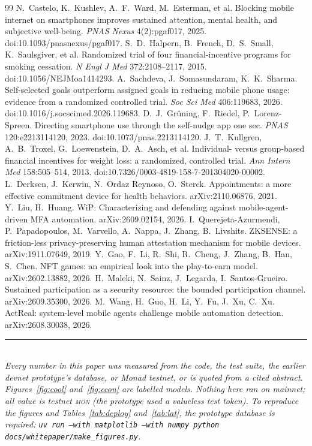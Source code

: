 \documentclass[10pt]{article}
\newcommand{\code}[1]{\texttt{\small #1}}
\newcommand{\mon}{\textsc{mon}}
\begin{document}
\begin{thebibliography}{99}\small
{} N.~Castelo, K.~Kushlev, A.~F.~Ward, M.~Esterman, et al. Blocking mobile internet on smartphones
improves sustained attention, mental health, and subjective well-being. \emph{PNAS Nexus} 4(2):pgaf017, 2025.
doi:10.1093/pnasnexus/pgaf017.
 S.~D.~Halpern, B.~French, D.~S.~Small, K.~Saulsgiver, et al. Randomized trial of four
financial-incentive programs for smoking cessation. \emph{N Engl J Med} 372:2108--2117, 2015. doi:10.1056/NEJMoa1414293.
 A.~Sachdeva, J.~Somasundaram, K.~K.~Sharma. Self-selected goals outperform assigned goals in
reducing mobile phone usage: evidence from a randomized controlled trial. \emph{Soc Sci Med} 406:119683, 2026.
doi:10.1016/j.socscimed.2026.119683.
 D.~J.~Grüning, F.~Riedel, P.~Lorenz-Spreen. Directing smartphone use through the self-nudge app
one sec. \emph{PNAS} 120:e2213114120, 2023. doi:10.1073/pnas.2213114120.
 J.~T.~Kullgren, A.~B.~Troxel, G.~Loewenstein, D.~A.~Asch, et al. Individual- versus group-based
financial incentives for weight loss: a randomized, controlled trial. \emph{Ann Intern Med} 158:505--514, 2013.
doi:10.7326/0003-4819-158-7-201304020-00002.
 L.~Derksen, J.~Kerwin, N.~Ordaz Reynoso, O.~Sterck. Appointments: a more effective commitment
device for health behaviors. arXiv:2110.06876, 2021.
 Y.~Liu, H.~Huang. WiP: Characterizing and defending against mobile-agent-driven MFA automation.
arXiv:2609.02154, 2026.
 I.~Querejeta-Azurmendi, P.~Papadopoulos, M.~Varvello, A.~Nappa, J.~Zhang, B.~Livshits. ZKSENSE: a
friction-less privacy-preserving human attestation mechanism for mobile devices. arXiv:1911.07649, 2019.
 Y.~Gao, F.~Li, R.~Shi, R.~Cheng, J.~Zhang, B.~Han, S.~Chen. NFT games: an empirical look into the
play-to-earn model. arXiv:2602.13882, 2026.
 H.~Maleki, N.~Sainz, J.~Legarda, I.~Santos-Grueiro. Sustained participation as a security resource:
the bounded participation channel. arXiv:2609.35300, 2026.
 M.~Wang, H.~Guo, H.~Li, Y.~Fu, J.~Xu, C.~Xu. ActReal: system-level mobile agents challenge mobile
automation detection. arXiv:2608.30038, 2026.
\end{thebibliography}

\vspace{6pt}
\noindent\rule{\linewidth}{.4pt}\\
\small\emph{Every number in this paper was measured from the code, the test suite, the earlier devnet prototype's
database, or Monad testnet, or is quoted from a cited abstract. Figures~\ref{fig:cool} and~\ref{fig:econ} are labelled
models. Nothing here ran on mainnet; all value is testnet \mon{} (the prototype used a valueless test token). To
reproduce the figures and Tables~\ref{tab:deploy} and~\ref{tab:lat}, the prototype database is required:
\code{uv run --with matplotlib --with numpy python docs/whitepaper/make\_figures.py}.}
\end{document}
